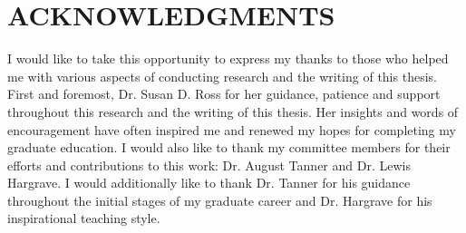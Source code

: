 \chapter*{ACKNOWLEDGMENTS}


I would like to take this opportunity to express my thanks to those
who helped me with various aspects of conducting research and the writing
of this thesis.
First and foremost, Dr. Susan D. Ross for her guidance, patience and support
throughout this research and the writing of this thesis.
Her insights and words of encouragement have often inspired me and renewed
my hopes for completing my graduate education.
I would also like to thank my committee members for their efforts
and contributions to this work: Dr. August Tanner and
Dr. Lewis Hargrave.
I would additionally like to thank
Dr. Tanner for his guidance throughout the initial stages of my
graduate career and Dr. Hargrave for his inspirational teaching style.
